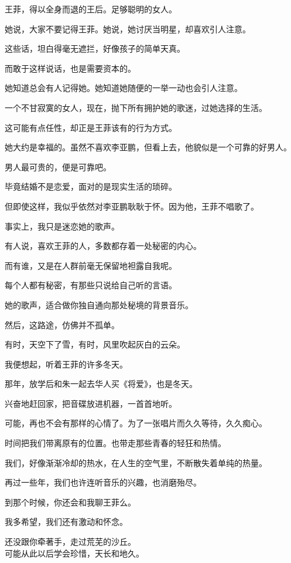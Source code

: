 		王菲，得以全身而退的王后。足够聪明的女人。\par
		她说，大家不要记得王菲。她说，她讨厌当明星，却喜欢引人注意。\par
		这些话，坦白得毫无遮拦，好像孩子的简单天真。\par
		而敢于这样说话，也是需要资本的。\par
		她知道总会有人记得她。她知道她随便的一举一动也会引人注意。\par
		一个不甘寂寞的女人，现在，抛下所有拥护她的歌迷，过她选择的生活。\par
		这可能有点任性，却正是王菲该有的行为方式。\par
		她大约是幸福的。虽然不喜欢李亚鹏，但看上去，他貌似是一个可靠的好男人。\par
		男人最可贵的，便是可靠吧。\par
		毕竟结婚不是恋爱，面对的是现实生活的琐碎。\par
		但即使这样，我似乎依然对李亚鹏耿耿于怀。因为他，王菲不唱歌了。

		事实上，我只是迷恋她的歌声。

		有人说，喜欢王菲的人，多数都存着一处秘密的内心。\par
		而有谁，又是在人群前毫无保留地袒露自我呢。\par
		每个人都有秘密，有那些只说给自己听的言语。\par
		她的歌声，适合做你独自通向那处秘境的背景音乐。\par
		然后，这路途，仿佛并不孤单。

		有时，天空下了雪，有时，风里吹起灰白的云朵。\par
		我便想起，听着王菲的许多冬天。\par
		那年，放学后和朱一起去华人买《将爱》，也是冬天。\par
		兴奋地赶回家，把音碟放进机器，一首首地听。\par
		可能，再也不会有那样的心情了。为了一张唱片而久久等待，久久痴心。\par
		时间把我们带离原有的位置。也带走那些青春的轻狂和热情。\par
		我们，好像渐渐冷却的热水，在人生的空气里，不断散失着单纯的热量。\par
		再过一些年，我们也许连听音乐的兴趣，也消磨殆尽。\par
		到那个时候，你还会和我聊王菲么。\par
		我多希望，我们还有激动和怀念。

		\longpoem{}{}{}
			还没跟你牵著手，走过荒芜的沙丘。\\
			可能从此以后学会珍惜，天长和地久。
		\endlongpoem

